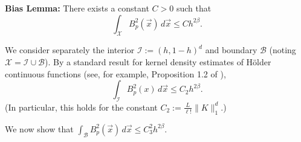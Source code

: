 \documentclass{article}
\newcommand{\X}{\mathcal{X}}                        %
\newcommand{\vx}{\vec{x}}                           %
\newcommand{\B}{\mathcal{B}}                        %
\begin{document}
{\bf Bias Lemma:} There exists a constant $C > 0$ such that
\begin{equation}
\label{ineq:bias_lemma}
    \int_\X B_p^2(\vx) \, d\vx \leq Ch^{2\beta}.
\end{equation}

We consider separately the interior $\mathcal{I} := (h,1 - h)^d$ and
boundary $\B$ (noting $\X = \mathcal{I} \cup \mathcal{B}$). By a standard
result for kernel density estimates of H\"{o}lder continuous functions (see,
for example, Proposition 1.2 of \citet{Tsybakov:2008:INE:1522486}),
\[\int_{\mathcal{I}} B_p^2(x) \, d\vx \leq C_2h^{2\beta}.\]
(In particular, this holds for the constant
$\displaystyle C_2 := \frac{L}{\ell!}\|K\|_1^d$.)

We now show that
$\displaystyle \int_{\mathcal{B}} B_p^2(\vx) \, d\vx \leq C_3^2h^{2\beta}$.
\end{document}
